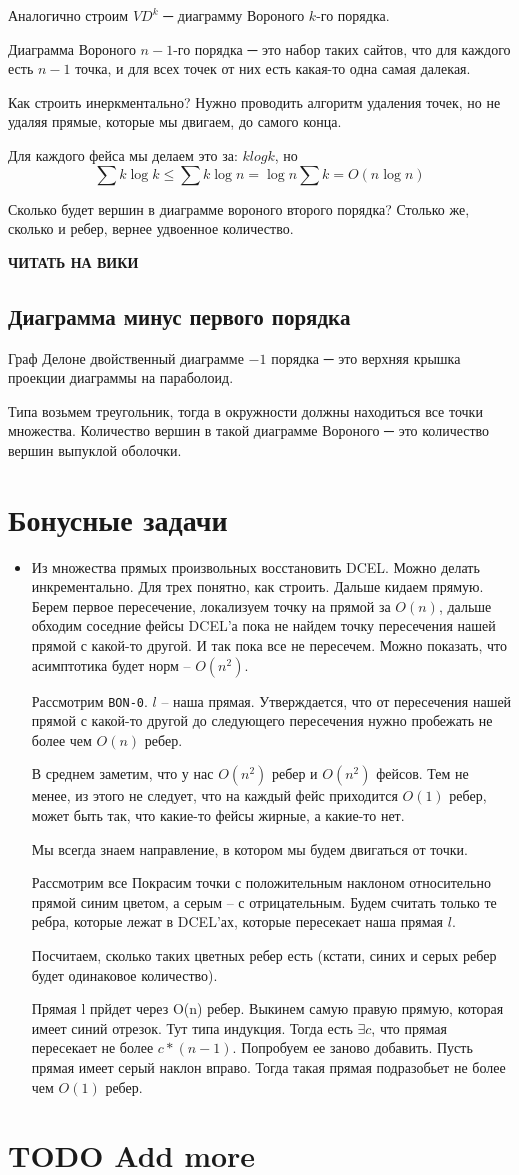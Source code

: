 \documentclass[11pt]{article}
\begin{document}
Аналогично строим $VD^k$ ─ диаграмму Вороного $k$-го порядка.

Диаграмма Вороного $n-1$-го порядка ─ это набор таких сайтов, что
для каждого есть $n-1$ точка, и для всех точек от них есть какая-то
одна самая далекая.

Как строить инеркментально? Нужно проводить алгоритм удаления
точек, но не удаляя прямые, которые мы двигаем, до самого конца.

Для каждого фейса мы делаем это за: $klogk$, но \[\sum{k\log{k}}
   \le \sum{k\log{n}} = \log{n}\sum{k} = O(n\log{n})\]

Сколько будет вершин в диаграмме вороного второго порядка? Столько
же, сколько и ребер, вернее удвоенное количество.

\textbf{ЧИТАТЬ НА ВИКИ}
\subsection{Диаграмма минус первого порядка}
\label{sec-24-6}
Граф Делоне двойственный диаграмме $-1$ порядка ─ это верхняя крышка
проекции диаграммы на параболоид.

Типа возьмем треугольник, тогда в окружности должны находиться все
точки множества. Количество вершин в такой диаграмме Вороного ─
это количество вершин выпуклой оболочки.
\section{Бонусные задачи}
\label{sec-25}
\begin{itemize}
\item Из множества прямых произвольных восстановить DCEL. Можно делать
инкрементально. Для трех понятно, как строить. Дальше кидаем
прямую. Берем первое пересечение, локализуем точку на прямой за
$O(n)$, дальше обходим соседние фейсы DCEL'а пока не найдем точку
пересечения нашей прямой с какой-то другой. И так пока все не
пересечем. Можно показать, что асимптотика будет норм --
$O(n^2)$.

Рассмотрим \verb~BON-0~. $l$ -- наша прямая. Утверждается, что от
пересечения нашей прямой с какой-то другой до следующего
пересечения нужно пробежать не более чем $O(n)$ ребер.

В среднем заметим, что у нас $O(n^2)$ ребер и $O(n^2)$ фейсов. Тем не
менее, из этого не следует, что на каждый фейс приходится $O(1)$
ребер, может быть так, что какие-то фейсы жирные, а какие-то нет.

Мы всегда знаем направление, в котором мы будем двигаться от
точки.

Рассмотрим все Покрасим точки с положительным наклоном
относительно прямой синим цветом, а серым -- с
отрицательным. Будем считать только те ребра, которые лежат в
DCEL'ах, которые пересекает наша прямая $l$.

Посчитаем, сколько таких цветных ребер есть (кстати, синих и серых
ребер будет одинаковое количество).

Прямая l прйдет через O(n) ребер. Выкинем самую правую прямую,
которая имеет синий отрезок. Тут типа индукция. Тогда есть
$\exists{c}$, что прямая пересекает не более $c*(n-1)$. Попробуем ее
заново добавить. Пусть прямая имеет серый наклон вправо. Тогда
такая прямая подразобьет не более чем $O(1)$ ребер.
\end{itemize}
\section{TODO Add more}
\label{sec-26}
\end{document}
